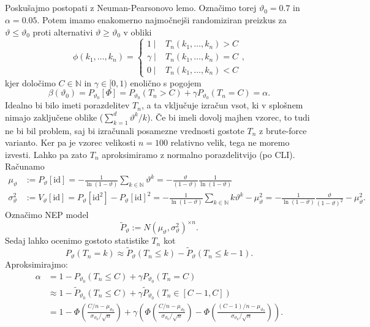 \documentclass[ letterpaper, titlepage, fleqn]{article}
\newcommand{\N}{\mathbb N}
\newcommand{\id}{\text{id}}
\begin{document}
\subsection{}
Poskušajmo postopati z Neuman-Pearsonovo lemo. Označimo torej $\vartheta_0 = 0.7$ in $\alpha = 0.05$.
Potem imamo enakomerno najmočnejši randomiziran preizkus za $\vartheta \leq \vartheta_0$ proti alternativi
$\vartheta \ge \vartheta_0$ v obliki
$$
\phi(k_1, \dots, k_n)= 
\begin{cases}
1 \mid & T_n(k_1, \dots, k_n) > C \\
\gamma \mid &  T_n(k_1, \dots, k_n) = C \\
0 \mid &  T_n(k_1, \dots, k_n) < C
\end{cases},
$$
kjer določimo $C \in\N$ in $\gamma \in [0,1)$ enolično s pogojem
$$\beta(\vartheta_0) = P_{\vartheta_0}[\Phi] = P_{\vartheta_0}(T_n > C) + \gamma P_{\vartheta_0}(T_n = C) = \alpha.$$
Idealno bi bilo imeti porazdelitev $T_n$, a ta vključuje izračun vsot, ki v splošnem nimajo zaključene oblike ($\sum_{k=1}^d \vartheta^k / k$). Če bi imeli dovolj majhen vzorec, to tudi ne bi bil problem, saj bi izračunali posamezne vrednosti gostote $T_n$ z brute-force varianto. Ker pa je vzorec velikosti $n=100$ relativno velik, tega ne moremo izvesti. Lahko pa zato $T_n$ aproksimiramo z normalno porazdelitvijo (po CLI). Računamo
\begin{equation*}
\begin{aligned}
\mu_\vartheta 
&:= P_{\vartheta}[\id] 
= -\frac{1}{\ln(1 - \vartheta)} \sum_{k\in\N} \vartheta^k 
= -\frac{\vartheta}{(1 - \vartheta)} \frac{1}{\ln(1 - \vartheta)} \\
\sigma_\vartheta^2 
&:= V_{\vartheta}[\id] 
= P_{\vartheta}[\id^2] - P_{\vartheta}[\id]^2 
= -\frac{1}{\ln(1 - \vartheta)} \sum_{k\in\N} k\vartheta^k - \mu_\vartheta^2 
= -\frac{1}{\ln(1 - \vartheta)} \frac{\vartheta}{(1-\vartheta)^2} - \mu_\vartheta^2.
\end{aligned}
\end{equation*}
Označimo NEP model
$$\tilde{P}_\vartheta := N(\mu_\vartheta, \sigma_\vartheta^2)^{\times n}.$$
Sedaj lahko ocenimo gostoto statistike $T_n$ kot
$$P_\vartheta(T_n = k) \approx \tilde{P}_\vartheta(T_n \leq k) - \tilde{P}_\vartheta(T_n \leq k-1).$$
Aproksimirajmo:
\begin{equation*}
\begin{aligned}
\alpha &= 1 - P_{\vartheta_0}(T_n \leq C) + \gamma P_{\vartheta_0}(T_n = C) \\
&\approx 1 - \tilde{P}_{\vartheta_0}(T_n \leq C) + \gamma \tilde{P}_{\vartheta_0}(T_n \in [C-1, C]) \\
&= 1 - \Phi\left(\frac{C/n - \mu_{\vartheta_0}}{\sigma_{\vartheta_0} / \sqrt{n}}\right) + \gamma\left(
\Phi\left(\frac{C/n - \mu_{\vartheta_0}}{\sigma_{\vartheta_0} / \sqrt{n}}\right) -
\Phi\left(\frac{(C-1)/n - \mu_{\vartheta_0}}{\sigma_{\vartheta_0} / \sqrt{n}}\right)
\right).
\end{aligned}
\end{equation*}
\end{document}
